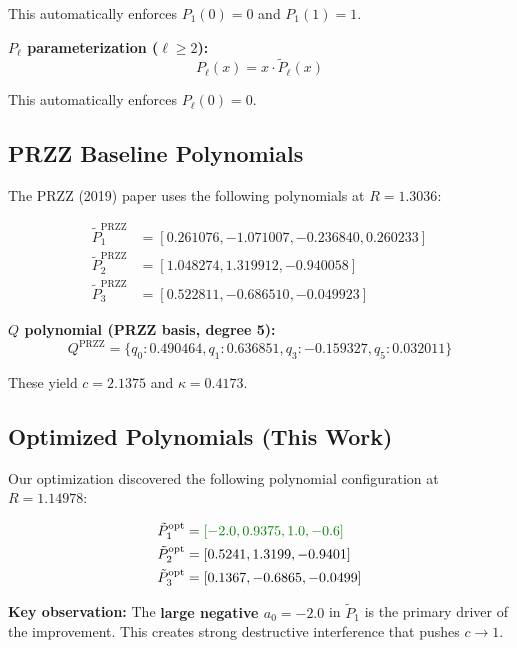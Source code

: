 \documentclass[11pt]{article}
\begin{document}
This automatically enforces $P_1(0) = 0$ and $P_1(1) = 1$.

\textbf{$P_\ell$ parameterization ($\ell \geq 2$):}
\begin{equation}
P_\ell(x) = x \cdot \tilde{P}_\ell(x)
\end{equation}

This automatically enforces $P_\ell(0) = 0$.

\subsection{PRZZ Baseline Polynomials}

The PRZZ (2019) paper uses the following polynomials at $R = 1.3036$:

\begin{align}
\tilde{P}_1^{\text{PRZZ}} &= [0.261076, -1.071007, -0.236840, 0.260233] \\
\tilde{P}_2^{\text{PRZZ}} &= [1.048274, 1.319912, -0.940058] \\
\tilde{P}_3^{\text{PRZZ}} &= [0.522811, -0.686510, -0.049923]
\end{align}

\textbf{$Q$ polynomial (PRZZ basis, degree 5):}
\begin{equation}
Q^{\text{PRZZ}} = \{q_0: 0.490464, q_1: 0.636851, q_3: -0.159327, q_5: 0.032011\}
\end{equation}

These yield $c = 2.1375$ and $\kappa = 0.4173$.

\subsection{Optimized Polynomials (This Work)}

Our optimization discovered the following polynomial configuration at $R = 1.14978$:

\begin{align}
\tilde{P}_1^{\text{opt}} &= \textcolor{improvement}{[-2.0, 0.9375, 1.0, -0.6]} \\
\tilde{P}_2^{\text{opt}} &= [0.5241, 1.3199, -0.9401] \\
\tilde{P}_3^{\text{opt}} &= [0.1367, -0.6865, -0.0499]
\end{align}

\textbf{Key observation:} The \textcolor{improvement}{\textbf{large negative $a_0 = -2.0$}} in $\tilde{P}_1$ is the primary driver of the improvement. This creates strong destructive interference that pushes $c \to 1$.
\end{document}
